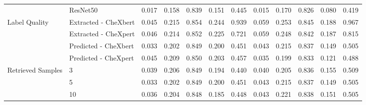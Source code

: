 \begin{tabular}{llrrrrrrrrrr}
 & ResNet50 & 0.017 & 0.158 & 0.839 & 0.151 & 0.445 & 0.015 & 0.170 & 0.826 & 0.080 & 0.419 \\
\cmidrule{1-12}
\multirow[c]{4}{*}{Label Quality} & Extracted - CheXbert & 0.045 & 0.215 & 0.854 & 0.244 & 0.939 & 0.059 & 0.253 & 0.845 & 0.188 & 0.967 \\
 & Extracted - CheXpert & 0.046 & 0.214 & 0.852 & 0.225 & 0.721 & 0.059 & 0.248 & 0.842 & 0.187 & 0.815 \\
 & Predicted - CheXbert & 0.033 & 0.202 & 0.849 & 0.200 & 0.451 & 0.043 & 0.215 & 0.837 & 0.149 & 0.505 \\
 & Predicted - CheXpert & 0.045 & 0.209 & 0.850 & 0.203 & 0.457 & 0.035 & 0.199 & 0.833 & 0.121 & 0.488 \\
\cmidrule{1-12}
\multirow[c]{3}{*}{Retrieved Samples} & 3 & 0.039 & 0.206 & 0.849 & 0.194 & 0.440 & 0.040 & 0.205 & 0.836 & 0.155 & 0.509 \\
 & 5 & 0.033 & 0.202 & 0.849 & 0.200 & 0.451 & 0.043 & 0.215 & 0.837 & 0.149 & 0.505 \\
 & 10 & 0.036 & 0.204 & 0.848 & 0.185 & 0.448 & 0.043 & 0.221 & 0.838 & 0.151 & 0.505 \\
\cmidrule{1-12}
\bottomrule
\end{tabular}
